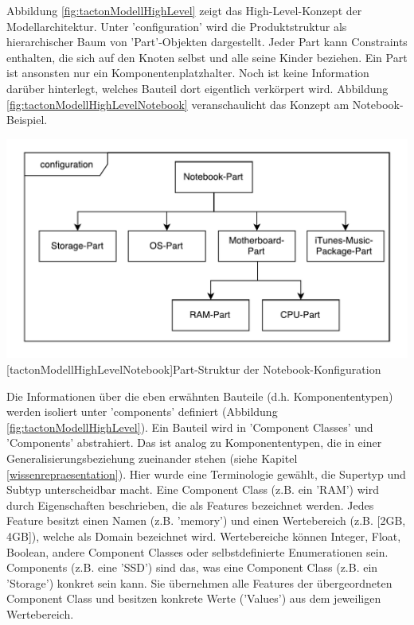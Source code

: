\documentclass[11pt, a4paper, titlepage, listof=totoc, bibliography=totoc, index=totoc, twoside, openright, headings=normal]{scrreprt}
\begin{document}
Abbildung \ref{fig:tactonModellHighLevel} zeigt das High-Level-Konzept der Modellarchitektur. Unter 'configuration' wird die Produktstruktur als hierarchischer Baum  von 'Part'-Objekten dargestellt. Jeder Part kann Constraints enthalten, die sich auf den Knoten selbst und alle seine Kinder beziehen. Ein Part ist ansonsten nur ein Komponentenplatzhalter. Noch ist keine Information darüber hinterlegt, welches Bauteil dort eigentlich verkörpert wird. Abbildung \ref{fig:tactonModellHighLevelNotebook} veranschaulicht das Konzept am Notebook-Beispiel.

\vspace{1em}
\begin{minipage}{\linewidth}
	\centering
	\includegraphics[width=0.7\linewidth]{Abbildungen/tactonModellHighLevelNotebook.pdf}
	[tactonModellHighLevelNotebook]{Part-Struktur der Notebook-Konfiguration}
	\label{fig:tactonModellHighLevelNotebook}
\end{minipage}
\vspace{1em}

Die Informationen über die eben erwähnten Bauteile (d.h. Komponententypen) werden isoliert unter 'components' definiert (Abbildung \ref{fig:tactonModellHighLevel}). Ein Bauteil wird in 'Component Classes' und 'Components' abstrahiert. Das ist analog zu  Komponententypen, die in einer Generalisierungsbeziehung zueinander stehen (siehe Kapitel \ref{wissenrepraesentation}). Hier wurde eine Terminologie gewählt, die Supertyp und Subtyp unterscheidbar macht. Eine Component Class (z.B. ein 'RAM') wird durch Eigenschaften beschrieben, die als Features bezeichnet werden. Jedes Feature besitzt einen Namen (z.B. 'memory') und einen Wertebereich (z.B. [2GB, 4GB]), welche als Domain bezeichnet wird. Wertebereiche können Integer, Float, Boolean, andere Component Classes oder selbstdefinierte Enumerationen sein. Components (z.B. eine 'SSD') sind das, was eine Component Class (z.B. ein 'Storage') konkret sein kann. Sie übernehmen alle Features der übergeordneten Component Class und besitzen konkrete Werte ('Values') aus dem jeweiligen Wertebereich.
\end{document}
